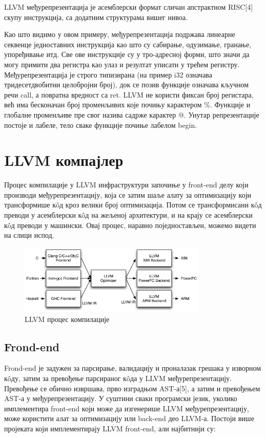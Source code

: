 \documentclass[12pt,oneside]{memoir}
\begin{document}
LLVM међурепрезентација је асемблерски формат сличан апстрактном RISC[4] скупу
инструкција, са додатним структурама вишег нивоа.

Као што видимо у овом примеру, међурепрезентација подржава линеарне секвенце
једноставних инструкција као што су сабирање, одузимање, гранање, упоређивање итд.
Све ове инструкције су у тро-адресној форми, што значи да могу примити два регистра 
као улаз и резултат уписати у трећем регистру.
Међурепрезентација је строго типизирана (на пример i32 означава тридесетдвобитни
целобројни број), док се позив функције означава кључном речи call, а повратна
вредност са ret.
LLVM не користи фиксан број регистара, већ има бесконачан број променљивих које
почињу карактером \%. 
Функције и глобалне променљиве пре свог назива садрже карактер @.
Унутар репрезентације постоје и лабеле, тело сваке функције почиње лабелом begin.

\section{LLVM компајлер}  

Процес компилације у LLVM инфраструктури започиње у front-end делу који производи
међурепрезентацију, која се затим шаље алату за оптимизацију који трансформише
к\^{o}д кроз велики број оптимизација.
Потом се трансформисани к\^{o}д преводи у асемблерски к\^{o}д на жељеној архитектури, 
и на крају се асемблерски к\^{o}д преводи у машински. 
Овај процес, наравно поједностављен, можемо видети на слици испод. 

\begin{figure}[!ht]
  \centering
  \includegraphics[width=0.8\textwidth]{LLVMCompiler1.png}
  \caption{LLVM процес компилације}
  \label{fig:grafikon}
\end{figure}

\subsection{Frond-end}
 Frond-end је задужен за парсирање, валидацију и проналазак грешака у изворном
 к\^{o}ду, затим за превођење парсираног к\^{o}да у LLVM међурепрезентацију.
 Превођење се обично извршава, прво изградњом AST-а[5], а затим 
 и превођењем AST-а у међурепрезентацију.
 У суштини сваки програмски језик, уколико имплементира front-end који може да
 изгенерише LLVM међурепрезентацију, може користити алат за оптимизацију или 
 back-end део LLVM-а.
 Постоји више пројеката који имплементирају LLVM front-end, али најбитнији су:
 
\end{document}
